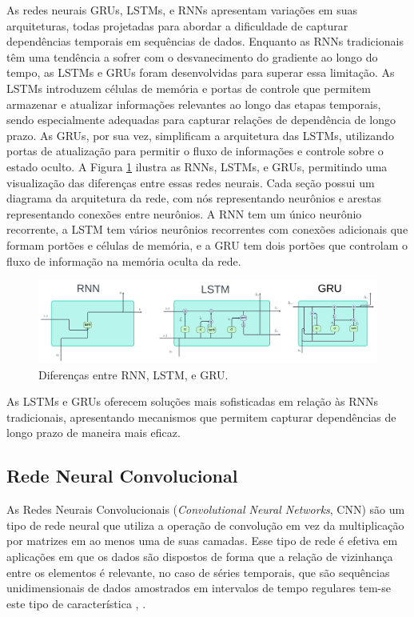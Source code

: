  As redes neurais GRUs, LSTMs, e RNNs apresentam variações em suas arquiteturas, todas projetadas para abordar a dificuldade de capturar dependências temporais em sequências de dados. Enquanto as RNNs tradicionais têm uma tendência a sofrer com o desvanecimento do gradiente ao longo do tempo, as LSTMs e GRUs foram desenvolvidas para superar essa limitação. As LSTMs introduzem células de memória e portas de controle que permitem armazenar e atualizar informações relevantes ao longo das etapas temporais, sendo especialmente adequadas para capturar relações de dependência de longo prazo. As GRUs, por sua vez, simplificam a arquitetura das LSTMs, utilizando portas de atualização para permitir o fluxo de informações e controle sobre o estado oculto.
 A Figura \ref{fig:rnn-vs-lstm-vs-gru-1024x308} ilustra as RNNs, LSTMs, e GRUs, permitindo uma visualização das diferenças entre essas redes neurais. Cada seção possui um diagrama da arquitetura da rede, com nós representando neurônios e arestas representando conexões entre neurônios. A RNN tem um único neurônio recorrente, a LSTM tem vários neurônios recorrentes com conexões adicionais que formam portões e células de memória, e a GRU tem dois portões que controlam o fluxo de informação na memória oculta da rede. 
 
 \begin{figure}[!htb]
 	\centering
 	\caption{Diferenças entre RNN, LSTM, e GRU.}
 	\label{fig:rnn-vs-lstm-vs-gru-1024x308}
 	\includegraphics[width=\linewidth]{Modelos/Figuras/RNN-vs-LSTM-vs-GRU-1024x308.pdf}
 \end{figure}
 
  As LSTMs e GRUs oferecem soluções mais sofisticadas em relação às RNNs tradicionais, apresentando mecanismos que permitem capturar dependências de longo prazo de maneira mais eficaz.
 
 \subsection{Rede Neural Convolucional}
 
As Redes Neurais Convolucionais (\textit{Convolutional Neural Networks}, CNN) são um tipo de rede neural que utiliza a operação de convolução em vez da multiplicação por matrizes em ao menos uma de suas camadas. Esse tipo de rede é efetiva em aplicações em que os dados são dispostos de forma que a relação de vizinhança entre os elementos é relevante, no caso de séries temporais, que são sequências unidimensionais de dados amostrados em intervalos de tempo regulares tem-se este tipo de característica \cite{silva_2021}, \cite{7533055} .
 
